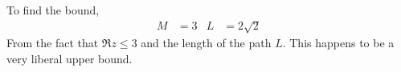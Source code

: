 \begin{enumerate}
          To find the bound,
          \begin{align}
              M & = 3 & L & = 2\sqrt{2}
          \end{align}
          From the fact that $ \Re{z} \leq 3$ and the length of the path $ L $. This
          happens to be a very liberal upper bound.
\end{enumerate}